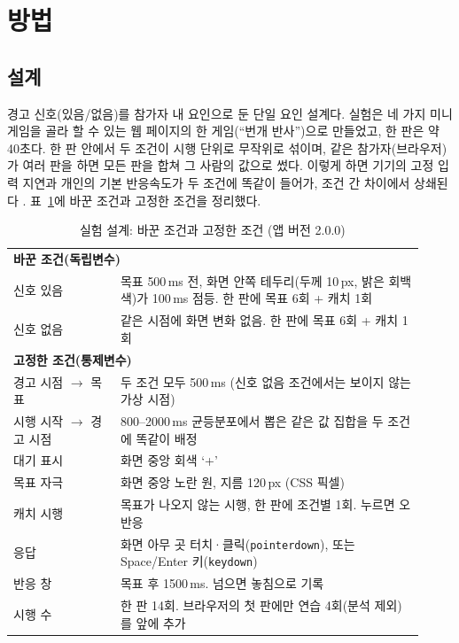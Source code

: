 \section{방법}

\subsection{설계}\label{sec:design}
경고 신호(있음/없음)를 참가자 내 요인으로 둔 단일 요인 설계다.
실험은 네 가지 미니게임을 골라 할 수 있는 웹 페이지의 한 게임(``번개 반사'')으로 만들었고, 한 판은 약 40초다.
한 판 안에서 두 조건이 시행 단위로 무작위로 섞이며, 같은 참가자(브라우저)가 여러 판을 하면 모든 판을 합쳐 그 사람의 값으로 썼다.
이렇게 하면 기기의 고정 입력 지연과 개인의 기본 반응속도가 두 조건에 똑같이 들어가, 조건 간 차이에서 상쇄된다 \citep{pronk2020}.
표~\ref{tab:design}에 바꾼 조건과 고정한 조건을 정리했다.

\begin{table}[h]
\centering\small
\caption{실험 설계: 바꾼 조건과 고정한 조건 (앱 버전 2.0.0)}\label{tab:design}
\begin{tabular}{p{0.24\linewidth}p{0.68\linewidth}}
\toprule
\multicolumn{2}{l}{\textbf{바꾼 조건(독립변수)}}\\
신호 있음 & 목표 500\,ms 전, 화면 안쪽 테두리(두께 10\,px, 밝은 회백색)가 100\,ms 점등. 한 판에 목표 6회 + 캐치 1회\\
신호 없음 & 같은 시점에 화면 변화 없음. 한 판에 목표 6회 + 캐치 1회\\
\midrule
\multicolumn{2}{l}{\textbf{고정한 조건(통제변수)}}\\
경고 시점 $\to$ 목표 & 두 조건 모두 500\,ms (신호 없음 조건에서는 보이지 않는 가상 시점)\\
시행 시작 $\to$ 경고 시점 & 800--2000\,ms 균등분포에서 뽑은 같은 값 집합을 두 조건에 똑같이 배정\\
대기 표시 & 화면 중앙 회색 `+'\\
목표 자극 & 화면 중앙 노란 원, 지름 120\,px (CSS 픽셀)\\
캐치 시행 & 목표가 나오지 않는 시행, 한 판에 조건별 1회. 누르면 오반응\\
응답 & 화면 아무 곳 터치·클릭(\texttt{pointerdown}), 또는 Space/Enter 키(\texttt{keydown})\\
반응 창 & 목표 후 1500\,ms. 넘으면 놓침으로 기록\\
시행 수 & 한 판 14회. 브라우저의 첫 판에만 연습 4회(분석 제외)를 앞에 추가\\
\bottomrule
\end{tabular}
\end{table}

